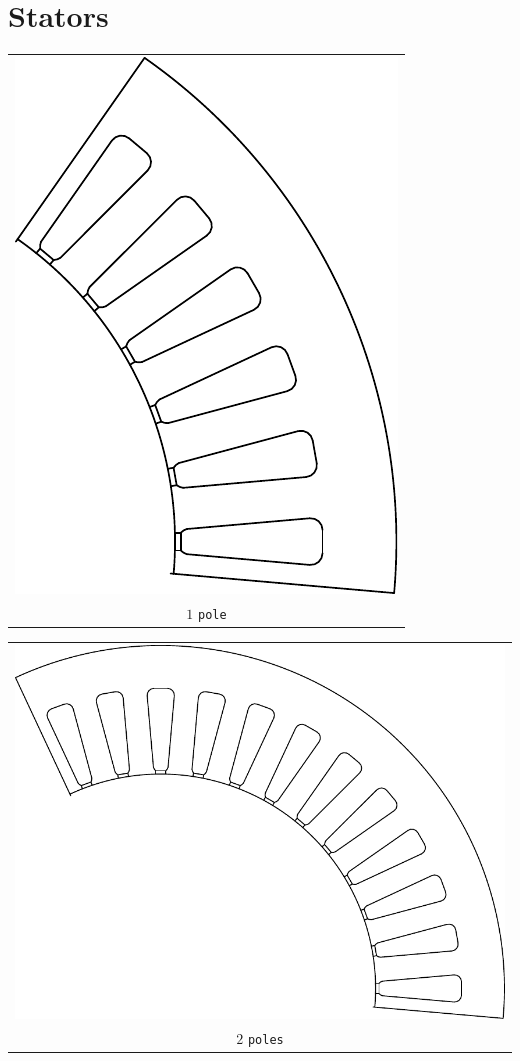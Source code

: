 \documentclass[a4paper,11pt,oneside]{report}
\begin{document}
\section{Stators}
\begin{tabular}{c}
\includegraphics[scale=0.75]{../examples/stators/1pole} 
\\
$ 1 $ \texttt{pole}
\end{tabular}
\vspace{5mm}

\begin{tabular}{c}
\includegraphics[scale=0.75]{../examples/stators/2pole} 
\\
$ 2 $ \texttt{poles}
\end{tabular}
\vspace{5mm}
\end{document}
